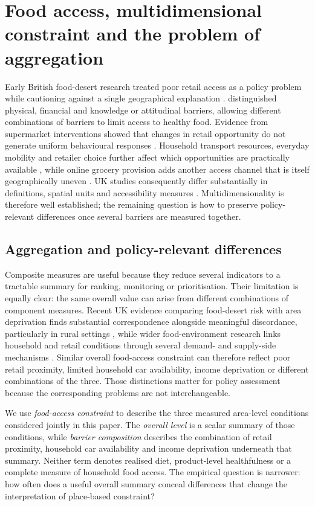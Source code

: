 \documentclass[11pt,a4paper]{article}
\begin{document}
\section{Food access, multidimensional constraint and the problem of aggregation}
Early British food-desert research treated poor retail access as a policy problem while cautioning against a single geographical explanation \citep{Wrigley2002,Whelan2002,Wrigley2003}. \citet{Shaw2006} distinguished physical, financial and knowledge or attitudinal barriers, allowing different combinations of barriers to limit access to healthy food. Evidence from supermarket interventions showed that changes in retail opportunity do not generate uniform behavioural responses \citep{GillRudkin2014,FreireRudkin2019}. Household transport resources, everyday mobility and retailer choice further affect which opportunities are practically available \citep{VerPloegWilde2018,Shannon2016}, while online grocery provision adds another access channel that is itself geographically uneven \citep{Newing2022,Janatabadi2024}. UK studies consequently differ substantially in definitions, spatial units and accessibility measures \citep{Titis2022}. Multidimensionality is therefore well established; the remaining question is how to preserve policy-relevant differences once several barriers are measured together.

\subsection{Aggregation and policy-relevant differences}
Composite measures are useful because they reduce several indicators to a tractable summary for ranking, monitoring or prioritisation. Their limitation is equally clear: the same overall value can arise from different combinations of component measures. Recent UK evidence comparing food-desert risk with area deprivation finds substantial correspondence alongside meaningful discordance, particularly in rural settings \citep{Beydoun2026}, while wider food-environment research links household and retail conditions through several demand- and supply-side mechanisms \citep{Dong2025}. Similar overall food-access constraint can therefore reflect poor retail proximity, limited household car availability, income deprivation or different combinations of the three. Those distinctions matter for policy assessment because the corresponding problems are not interchangeable.

We use \emph{food-access constraint} to describe the three measured area-level conditions considered jointly in this paper. The \emph{overall level} is a scalar summary of those conditions, while \emph{barrier composition} describes the combination of retail proximity, household car availability and income deprivation underneath that summary. Neither term denotes realised diet, product-level healthfulness or a complete measure of household food access. The empirical question is narrower: how often does a useful overall summary conceal differences that change the interpretation of place-based constraint?
\end{document}
